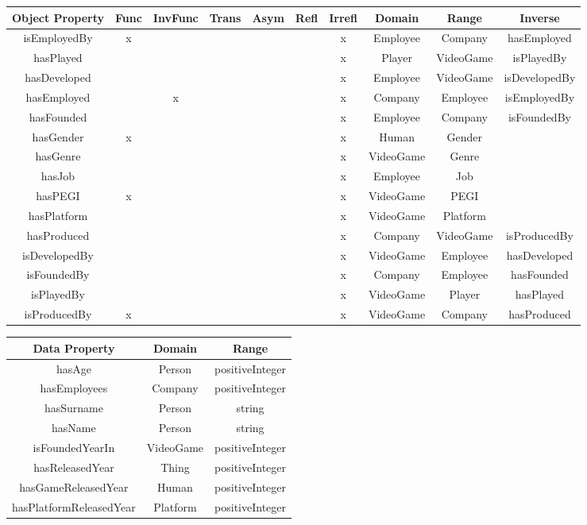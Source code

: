 \documentclass{article}
\begin{document}
\begin{table}[h!]
\centering
 \begin{tabular}{| c c c c c c c c c c |} 
 \hline
 Object Property & Func & InvFunc & Trans & Asym & Refl & Irrefl & Domain & Range & Inverse \\ [0.5ex] 
 \hline\hline
 isEmployedBy & x &  & & & & x & Employee & Company& hasEmployed  \\
 hasPlayed &  & & & & &x & Player& VideoGame &isPlayedBy  \\
 hasDeveloped &  & & & & & x &Employee &VideoGame & isDevelopedBy \\
 hasEmployed &  & x& & & &x & Company& Employee&isEmployedBy  \\
 hasFounded &  & & & & & x & Employee & Company& isFoundedBy \\
 hasGender & x & & & & &x &Human & Gender&  \\  
 hasGenre &  & & & & &x &VideoGame & Genre&  \\
 hasJob &  & & & & & x&Employee & Job&  \\
 hasPEGI & x & & & & & x& VideoGame& PEGI&  \\
 hasPlatform &  & & & & & x& VideoGame&Platform &  \\
 hasProduced &  & & & & & x&Company &VideoGame & isProducedBy \\
 isDevelopedBy &  & & & & &x &VideoGame & Employee& hasDeveloped \\
 isFoundedBy &  & & & & & x&Company & Employee& hasFounded \\
 isPlayedBy &  & & & & & x&VideoGame & Player& hasPlayed \\
 isProducedBy & x & & & & &x &VideoGame & Company& hasProduced \\[1ex] 
 \hline
 \end{tabular}
\end{table}
\begin{table}[h!]
\centering
 \begin{tabular}{| c  c c  |} 
 \hline
 Data Property  & Domain & Range \\ [0.5ex] 
 \hline\hline
 hasAge &   Person & positiveInteger   \\
 hasEmployees &  Company &positiveInteger \\
 hasSurname &   Person& string  \\
 hasName & Person& string   \\
 isFoundedYearIn &  VideoGame & positiveInteger \\
 hasReleasedYear & Thing  & positiveInteger  \\  
 hasGameReleasedYear & Human & positiveInteger\\ 
 hasPlatformReleasedYear & Platform & positiveInteger  \\ 
 [1ex] 
 \hline
 \end{tabular}
\end{table}
\end{document}
